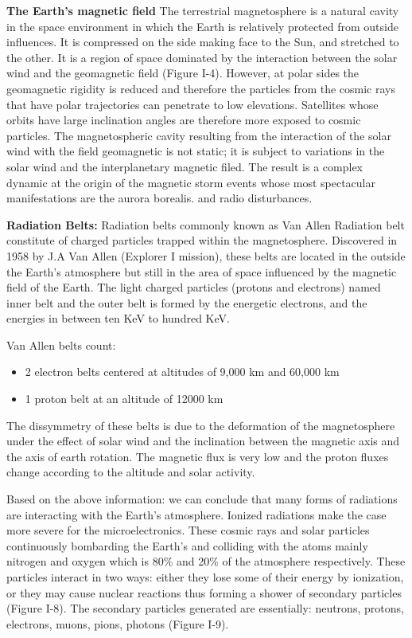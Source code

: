 \textbf{The Earth's magnetic field}
The terrestrial magnetosphere is a natural cavity in the space environment in which the
Earth is relatively protected from outside influences. It is compressed on the side making
face to the Sun, and stretched to the other. It is a region of space dominated by the interaction between
the solar wind and the geomagnetic field (Figure I-4). However, at polar sides
the geomagnetic rigidity is reduced and therefore the particles from the
cosmic rays that have polar trajectories can penetrate to low
elevations. Satellites whose orbits have large inclination angles are therefore more
exposed to cosmic particles. The magnetospheric cavity resulting from the interaction of the solar wind with the field
geomagnetic is not static; it is subject to variations in the solar wind and the
interplanetary magnetic filed. The result is a complex dynamic at the origin of the magnetic storm events whose most spectacular manifestations are the aurora borealis.
and radio disturbances.

\textbf{Radiation Belts:}
Radiation belts commonly known as Van Allen Radiation belt constitute of charged particles trapped within the magnetosphere.
Discovered in 1958 by J.A Van Allen (Explorer I mission), these belts are located in the outside the Earth's atmosphere but still in the area of space influenced by the magnetic field of the Earth. The light charged particles (protons and electrons) named inner belt and the outer belt is formed by the energetic electrons, and the energies in between ten KeV to hundred KeV.

 

Van Allen belts count: 
\begin{itemize}

\item 2 electron belts centered at altitudes of 9,000 km and 60,000 km 
\item  1 proton belt at an altitude of 12000 km 


\end{itemize}
The dissymmetry of these belts is due to the deformation of the magnetosphere under the effect of solar wind and the inclination between the magnetic axis and the axis of earth rotation. 
The magnetic flux is very low and the proton fluxes change according to the altitude and
solar activity.


Based on the above information: we can conclude that many forms of radiations are interacting with the Earth's atmosphere. Ionized radiations make the case more severe for the microelectronics. These cosmic rays and solar particles continuously bombarding the Earth's and colliding with the atoms mainly nitrogen and oxygen which is 80\% and 20\% of the atmosphere respectively. These particles interact in two ways: either they lose some of their energy by ionization, or they may cause nuclear reactions thus forming a shower of
secondary particles (Figure I-8). The secondary particles generated are essentially:
neutrons, protons, electrons, muons, pions, photons (Figure I-9). 


